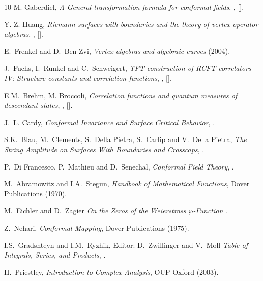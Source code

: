 \begin{thebibliography}{10}
M. Gaberdiel,
\textit{A General transformation formula for conformal fields},
,
[].

Y.-Z. Huang,
\textit{Riemann surfaces with boundaries and the theory of vertex operator algebras},
,
[].

E.~Frenkel and D.~Ben-Zvi,
\textit{Vertex algebras and algebraic curves} (2004).

J.~Fuchs, I.~Runkel and C.~Schweigert,
\textit{TFT construction of RCFT correlators IV: Structure constants and correlation functions},
,
[].

E.M.~Brehm, M. Broccoli,
\textit{Correlation functions and quantum measures of descendant states},
,
[].

J.~L. Cardy,
\textit{Conformal Invariance and Surface Critical Behavior},
.

S.K.~Blau, M.~Clements, S.~Della Pietra, S.~Carlip and V.~Della Pietra,
\textit{The String Amplitude on Surfaces With Boundaries and Crosscaps},
.

P.~Di Francesco, P.~Mathieu and D.~Senechal,
\textit{Conformal Field Theory},
.

M.~Abramowitz and I.A.~Stegun,
\textit{Handbook of Mathematical Functions},
Dover Publications (1970).

M.~Eichler and D.~Zagier
\textit{On the Zeros of the Weierstrass $\wp$-Function}
.

Z.~Nehari,
\textit{Conformal Mapping}, Dover Publications (1975).

I.S.~Gradshteyn and I.M.~Ryzhik,
Editor: D.~Zwillinger and V.~Moll
\textit{Table of Integrals, Series, and Products},
.

H.~Priestley,
\textit{Introduction to Complex Analysis},
OUP Oxford (2003).


\end{thebibliography}
